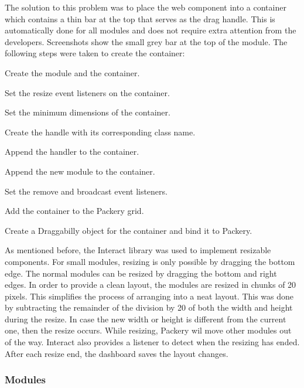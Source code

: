             The solution to this problem was to place the web component into a container which contains a thin bar at the top that serves as the drag handle. This is automatically done for all modules and does not require extra attention from the developers. Screenshots show the small grey bar at the top of the module. The following steps were taken to create the container:
            \vspace{-6pt}
            \begin{myenumerate}
                \item Create the module and the container.
                \item Set the resize event listeners on the container.
                \item Set the minimum dimensions of the container.
                \item Create the handle with its corresponding class name.
                \item Append the handler to the container.
                \item Append the new module to the container.
                \item Set the remove and broadcast event listeners.
                \item Add the container to the Packery grid.
                \item Create a Draggabilly object for the container and bind it to Packery.
            \end{myenumerate}


            As mentioned before, the Interact library was used to implement resizable components. For small modules, resizing is only possible by dragging the bottom edge. The normal modules can be resized by dragging the bottom and right edges. In order to provide a clean layout, the modules are resized in chunks of 20 pixels. This simplifies the process of arranging into a neat layout. This was done by subtracting the remainder of the division by 20 of both the width and height during the resize. In case the new width or height is different from the current one, then the resize occurs. While resizing, Packery wil move other modules out of the way. Interact also provides a listener to detect when the resizing has ended. After each resize end, the dashboard saves the layout changes.

        \subsubsection{Modules}

